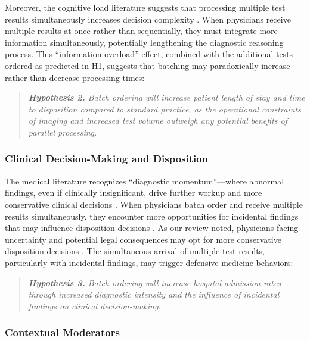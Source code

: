 \documentclass[,,nonblindrev]{informs}
\begin{document}
Moreover, the cognitive load literature suggests that processing
multiple test results simultaneously increases decision complexity
\citep{kc2013does}. When physicians receive multiple results at once
rather than sequentially, they must integrate more information
simultaneously, potentially lengthening the diagnostic reasoning
process. This ``information overload'' effect, combined with the
additional tests ordered as predicted in H1, suggests that batching may
paradoxically increase rather than decrease processing times:

\begin{quote}
\small
\textit{\textbf{Hypothesis 2.} Batch ordering will increase patient length of stay and time to disposition compared to standard practice, as the operational constraints of imaging and increased test volume outweigh any potential benefits of parallel processing.}
\end{quote}

\subsubsection{Clinical Decision-Making and
Disposition}\label{clinical-decision-making-and-disposition}

The medical literature recognizes ``diagnostic momentum''---where
abnormal findings, even if clinically insignificant, drive further
workup and more conservative clinical decisions
\citep[\citet{featherston2020decision}]{coen2022clinical}. When
physicians batch order and receive multiple results simultaneously, they
encounter more opportunities for incidental findings that may influence
disposition decisions
\citep[\citet{berlin2011incidentaloma}]{lumbreras2010incidental}. As our
review noted, physicians facing uncertainty and potential legal
consequences may opt for more conservative disposition decisions
\citep[\citet{lam2020why}]{rao2012overuse}. The simultaneous arrival of
multiple test results, particularly with incidental findings, may
trigger defensive medicine behaviors:

\begin{quote}
\small
\textit{\textbf{Hypothesis 3.} Batch ordering will increase hospital admission rates through increased diagnostic intensity and the influence of incidental findings on clinical decision-making.}
\end{quote}

\subsubsection{Contextual Moderators}\label{contextual-moderators}
\end{document}
